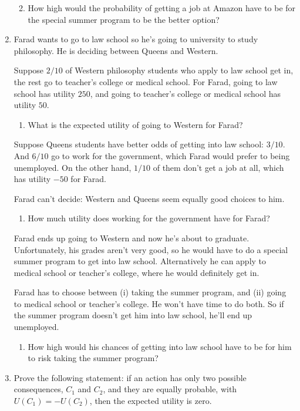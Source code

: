 \documentclass[justified]{tufte-book}
\providecommand{\tightlist}{%
  \setlength{\itemsep}{0pt}\setlength{\parskip}{0pt}}
\renewcommand{\u}{U}
\theoremstyle{definition}
\theoremstyle{definition}
\theoremstyle{definition}
\theoremstyle{remark}
\begin{document}
\begin{enumerate}
  \begin{enumerate}
  \def\labelenumii{\alph{enumii}.}
  \setcounter{enumii}{2}
  \tightlist
  \item
    How high would the probability of getting a job at Amazon have to be for the special summer program to be the better option?
  \end{enumerate}
\item
  Farad wants to go to law school so he's going to university to study philosophy. He is deciding between Queens and Western.

  Suppose \(2/10\) of Western philosophy students who apply to law school get in, the rest go to teacher's college or medical school. For Farad, going to law school has utility \(250\), and going to teacher's college or medical school has utility \(50\).

  \begin{enumerate}
  \def\labelenumii{\alph{enumii}.}
  \tightlist
  \item
    What is the expected utility of going to Western for Farad?
  \end{enumerate}

  Suppose Queens students have better odds of getting into law school: \(3/10\). And \(6/10\) go to work for the government, which Farad would prefer to being unemployed. On the other hand, \(1/10\) of them don't get a job at all, which has utility \(-50\) for Farad.

  Farad can't decide: Western and Queens seem equally good choices to him.

  \begin{enumerate}
  \def\labelenumii{\alph{enumii}.}
  \setcounter{enumii}{1}
  \tightlist
  \item
    How much utility does working for the government have for Farad?
  \end{enumerate}

  Farad ends up going to Western and now he's about to graduate. Unfortunately, his grades aren't very good, so he would have to do a special summer program to get into law school. Alternatively he can apply to medical school or teacher's college, where he would definitely get in.

  Farad has to choose between (i) taking the summer program, and (ii) going to medical school or teacher's college. He won't have time to do both. So if the summer program doesn't get him into law school, he'll end up unemployed.

  \begin{enumerate}
  \def\labelenumii{\alph{enumii}.}
  \setcounter{enumii}{2}
  \tightlist
  \item
    How high would his chances of getting into law school have to be for him to risk taking the summer program?
  \end{enumerate}
\item
  Prove the following statement: if an action has only two possible consequences, \(C_1\) and \(C_2\), and they are equally probable, with \(\u(C_1) = -\u(C_2)\), then the expected utility is zero.
\end{enumerate}
\end{document}
